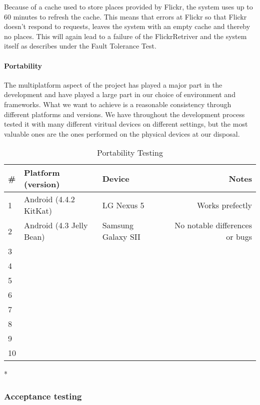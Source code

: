 Because of a cache used to store places provided by Flickr, the system uses up to 60 minutes to refresh the cache. This means that errors at Flickr so that Flickr doesn't respond to requests, leaves the system with an empty cache and thereby no places. This will again lead to a failure of the FlickrRetriver and the system itself as describes under the Fault Tolerance Test. 

\paragraph{Portability}

The multiplatform aspect of the project has played a major part in the development and have played a large part in our choice of environment and frameworks. What we want to achieve is a reasonable consistency through different platforms and versions. We have throughout the development process tested it with many different viritual devices on different settings, but the most valuable ones are the ones performed on the physical devices at our disposal.\\

\begin{table}[!htp]
\begin{center}
	\begin{tabular}{ | l | l | l | r | }
	\hline
	 \#	& Platform (version)	&Device			& Notes \\ \hline
	 1	&Android (4.4.2 KitKat)	&LG Nexus 5			& Works prefectly\\ \hline
	 2	&Android (4.3 Jelly Bean)	&Samsung Galaxy SII	& No notable differences or bugs\\ \hline
	 3&&&\\ \hline
	 4&&&\\ \hline
	 5&&&\\ \hline
	 6&&&\\ \hline
	 7&&&\\ \hline
	 8&&&\\ \hline
	 9&&&\\ \hline
	 10&&&\\ 
	 \hline
	 \end{tabular}
\end{center}
\caption{Portability Testing}
\label{tab:Portability Testing}
\end{table}


\/*

\subsubsection{Acceptance testing}



